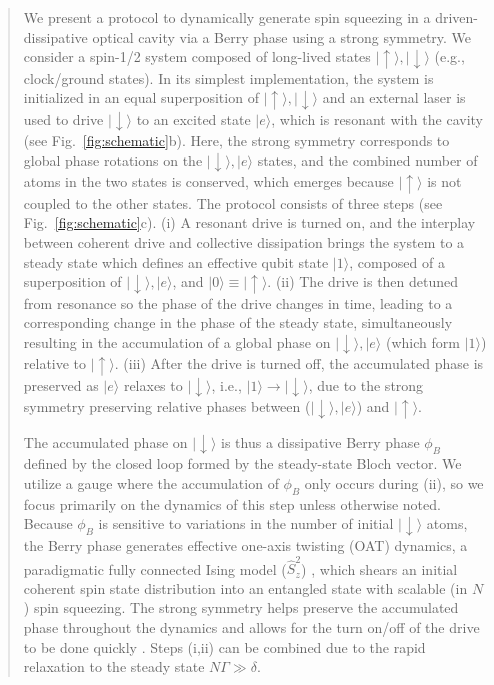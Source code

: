 \begin{abstract}
We present a protocol to dynamically generate spin squeezing in a driven-dissipative optical cavity via a Berry phase using a strong symmetry. 
We consider a spin-1/2 system composed of long-lived states $|{\uparrow}\rangle,|{\downarrow}\rangle$ (e.g., clock/ground states). In its simplest implementation, the system is initialized in an equal superposition of $|{\uparrow}\rangle,|{\downarrow}\rangle$ and an external laser is used to drive $|{\downarrow}\rangle$ to an excited state $|e\rangle$, which is resonant with the cavity (see Fig.~\ref{fig:schematic}b).  Here, the strong symmetry corresponds to global phase rotations on the $|{\downarrow}\rangle, |e\rangle$ states, and the combined number of atoms in the two states is conserved, which emerges because $|{\uparrow}\rangle$ is not coupled to the other states.
The protocol consists of three steps (see Fig.~\ref{fig:schematic}c). (i) A resonant drive is turned on, and the interplay between coherent drive and collective dissipation brings the system to a steady state which defines an effective qubit state $|1\rangle$, composed of a superposition of $|{\downarrow}\rangle, |e\rangle$, and $|0\rangle \equiv |{\uparrow}\rangle$.
(ii) The drive is then detuned from resonance so the phase of the drive changes in time, leading to a corresponding change in the phase of the steady state, simultaneously resulting in the accumulation of a global phase on $|{\downarrow} \rangle, |e\rangle$ (which form $|1\rangle$) relative to $|{\uparrow}\rangle$.
(iii) After the drive is turned off, the accumulated phase is preserved as $|e\rangle$ relaxes to $|{\downarrow}\rangle$, i.e., $|1\rangle \to |{\downarrow}\rangle$, due to the strong symmetry preserving relative phases between ($|{\downarrow}\rangle, |e\rangle$) and $|{\uparrow}\rangle$.

The accumulated phase on $|{\downarrow}\rangle$ is thus a dissipative Berry phase $\phi_B$ defined by the closed loop formed by the steady-state Bloch vector. We utilize a gauge where the accumulation of $\phi_B$ only occurs during (ii), so we focus primarily on the dynamics of this step unless otherwise noted. 
Because $\phi_B$ is sensitive to variations in the number of initial $|{\downarrow}\rangle$ atoms, the Berry phase generates effective one-axis twisting (OAT) dynamics, a paradigmatic fully connected Ising model ($\hat S_z^2$) \cite{Kitagawa1993}, 
which shears an initial coherent spin state distribution into an entangled state with scalable (in $N$) spin squeezing.
The strong symmetry helps preserve the accumulated phase throughout the dynamics and allows for the turn on/off of the drive to be done quickly \cite{suppcite}. Steps (i,ii) can be combined due to the rapid relaxation to the steady state $N \Gamma \gg \delta$. 


\end{abstract}
